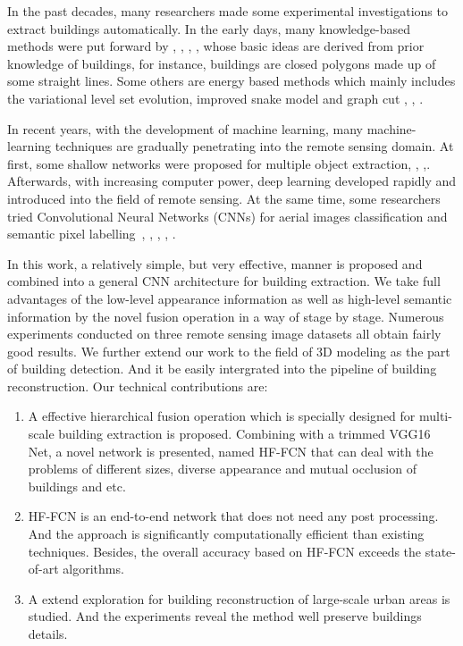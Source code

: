 In the past decades, many researchers made some experimental investigations to extract buildings automatically. In the early days, many knowledge-based methods were put forward by \cite{IEEEexample:huertas1988detecting}, \cite{IEEEexample:noronha2001detection}, \cite{IEEEexample:nosrati2009novel}, \cite{IEEEexample:izadi2012three}, \cite{IEEEexample:wang2015efficient} whose basic ideas are derived from prior knowledge of buildings, for instance, buildings are closed polygons made up of some straight lines. Some others are energy based methods which mainly includes the variational level set evolution, improved snake model and graph cut \cite{IEEEexample:cote2013automatic}, \cite{IEEEexample:peng2005improved}, \cite{IEEEexample:sirmacek2009urban}.


In recent years, with the development of machine learning, many machine-learning techniques are gradually penetrating into the remote sensing domain.
At first, some shallow networks were proposed for multiple object extraction\cite{IEEEexample:mnih2013machine}, \cite{IEEEexample:saito2016multiple}, \cite{IEEEexample:alshehhi2017simultaneous},\cite{IEEEexample:zhao2017contextually}. Afterwards, with increasing computer power, deep learning developed rapidly and introduced into the field of remote sensing. At the same time, some researchers tried Convolutional Neural Networks (CNNs) for aerial images classification and semantic pixel labelling~\cite{IEEEexample:paisitkriangkrai2015effective}, \cite{IEEEexample:liu2017dense}, \cite{IEEEexample:audebert2017deep}, \cite{IEEEexample:kampffmeyer2017urban}, \cite{IEEEexample:he2017multi}.


In this work, a relatively simple, but very effective, manner is proposed and combined into a general CNN architecture for building extraction. We take full advantages of the low-level appearance information as well as high-level semantic information by the novel fusion operation in a way of stage by stage.
Numerous experiments conducted on three remote sensing image datasets all obtain fairly good results.
We further extend our work to the field of 3D modeling as the part of building detection. And it be easily intergrated into the pipeline of building reconstruction.
Our technical contributions are:
%
\begin{enumerate}
	\item A effective hierarchical fusion operation which is specially designed for multi-scale building extraction is proposed. Combining with a trimmed VGG16 Net, a novel network is presented, named HF-FCN that can deal with the problems of different sizes, diverse appearance and mutual occlusion of buildings and etc.
	\item HF-FCN is an end-to-end network that does not need any post processing. And the approach is significantly computationally efficient than existing techniques. Besides, the overall accuracy based on HF-FCN exceeds the state-of-art algorithms.
	\item A extend exploration for building reconstruction of large-scale urban areas is studied. And the experiments reveal the method well preserve buildings details.
\end{enumerate}

